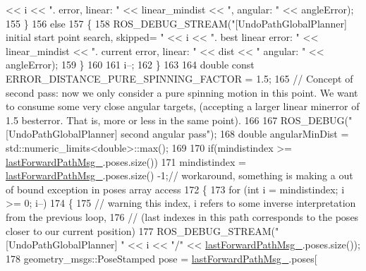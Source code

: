 \begin{DoxyCode}
       << i << \textcolor{stringliteral}{". error, linear: "} << linear\_mindist << \textcolor{stringliteral}{", angular: "} << angleError);
155                 \}
156                 \textcolor{keywordflow}{else}
157                 \{
158                     ROS\_DEBUG\_STREAM(\textcolor{stringliteral}{"[UndoPathGlobalPlanner] initial start point search, skipped= "} << i 
      << \textcolor{stringliteral}{". best linear error: "} << linear\_mindist << \textcolor{stringliteral}{". current error, linear: "} << dist << \textcolor{stringliteral}{" angular: "} << 
      angleError);
159                 \}
160 
161                 i--;
162             \}
163 
164             \textcolor{keywordtype}{double} \textcolor{keyword}{const} ERROR\_DISTANCE\_PURE\_SPINNING\_FACTOR = 1.5;
165             \textcolor{comment}{// Concept of second pass: now we only consider a pure spinning motion in this point. We want
       to consume some very close angular targets, (accepting a larger linear minerror of 1.5 besterror. That is,
       more or less in the same point).}
166 
167             ROS\_DEBUG(\textcolor{stringliteral}{"[UndoPathGlobalPlanner] second angular pass"});
168             \textcolor{keywordtype}{double} angularMinDist = std::numeric\_limits<double>::max();
169             
170                 \textcolor{keywordflow}{if}(mindistindex >=  \hyperlink{classcl__move__base__z_1_1undo__path__global__planner_1_1UndoPathGlobalPlanner_a9a4a6e40f5b6cb5f77dedbc5b6170871}{lastForwardPathMsg\_}.poses.size())
171                     mindistindex = \hyperlink{classcl__move__base__z_1_1undo__path__global__planner_1_1UndoPathGlobalPlanner_a9a4a6e40f5b6cb5f77dedbc5b6170871}{lastForwardPathMsg\_}.poses.size() -1;\textcolor{comment}{// workaround,
       something is making a out of bound exception in poses array access}
172             \{
173                 \textcolor{keywordflow}{for} (\textcolor{keywordtype}{int} i = mindistindex; i >= 0; i--)
174                 \{
175                     \textcolor{comment}{// warning this index, i refers to some inverse interpretation from the previous loop,}
176                     \textcolor{comment}{// (last indexes in this path corresponds to the poses closer to our current position)}
177                     ROS\_DEBUG\_STREAM(\textcolor{stringliteral}{"[UndoPathGlobalPlanner] "} << i << \textcolor{stringliteral}{"/"} << 
      \hyperlink{classcl__move__base__z_1_1undo__path__global__planner_1_1UndoPathGlobalPlanner_a9a4a6e40f5b6cb5f77dedbc5b6170871}{lastForwardPathMsg\_}.poses.size());
178                     geometry\_msgs::PoseStamped pose = \hyperlink{classcl__move__base__z_1_1undo__path__global__planner_1_1UndoPathGlobalPlanner_a9a4a6e40f5b6cb5f77dedbc5b6170871}{lastForwardPathMsg\_}.poses[

\end{DoxyCode}
